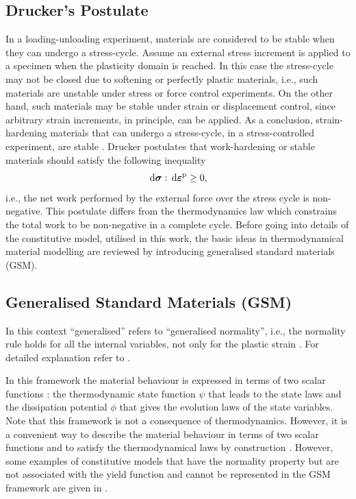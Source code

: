 \subsection{Drucker's Postulate}
In a loading-unloading experiment, materials are considered to be stable when they can undergo a stress-cycle. Assume an external stress increment is applied to a specimen when the plasticity domain is reached. In this case the stress-cycle may not be closed due to softening or perfectly plastic materials, i.e., such materials are unstable under stress or force control experiments. On the other hand, such materials may be stable under strain or displacement control, since arbitrary strain increments, in principle, can be applied. As a conclusion, strain-hardening materials that can undergo a stress-cycle, in a stress-controlled experiment, are stable \parencite{kelly2016}. Drucker postulates that work-hardening or stable materials should satisfy the following inequality
\begin{equation}
	{\,\rm d}{\mbox{$\bm \sigma$}} : {\,\rm d}\mbox{$\bm \varepsilon $}^{\rm p} \geq 0,
\end{equation}
i.e., the net work performed by the external force over the stress cycle is non-negative. This postulate differs from the thermodynamics law which constrains the total work to be non-negative in a complete cycle.
\smallskip
{}
\smallskip
Before going into details of the constitutive model, utilised in this work, the basic ideas in thermodynamical material modelling are reviewed by introducing generalised standard materials (GSM).

\subsection{Generalised Standard Materials (GSM)}
In this context ``generalised'' refers to ``generalised normality'', i.e., the normality rule holds for all the internal variables, not only for the plastic strain \parencite{lubliner2008plasticity,celigoj1998finite}. For detailed explanation refer to \parencite{Bodoville2001b,halphen1975materiaux,hackl1997generalized,mielke2006mathematical}.


In this framework the material behaviour is expressed in terms of two scalar functions \parencite{germain1975cours}: the thermodynamic state function $\psi$ that leads to the state laws and the dissipation potential $\phi$ that gives the evolution laws of the state variables. Note that this framework is not a consequence of thermodynamics. However, it is a convenient way to describe the material behaviour in terms of two scalar functions and to satisfy the thermodynamical laws by construction \parencite{onat1986representation,onat1986representation2}. However, some examples of constitutive models that have the normality property but are not associated with the yield function and cannot be represented in the GSM framework are given in \parencite{onat1986representation,onat1986representation2}.

